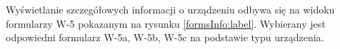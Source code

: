 Wyświetlanie szczegółowych informacji o urządzeniu odbywa się na widoku formularzy W-5 pokazanym na rysunku \ref{formsInfo:label}. Wybierany jest odpowiedni formularz W-5a, W-5b, W-5c na podstawie typu urządzenia.


